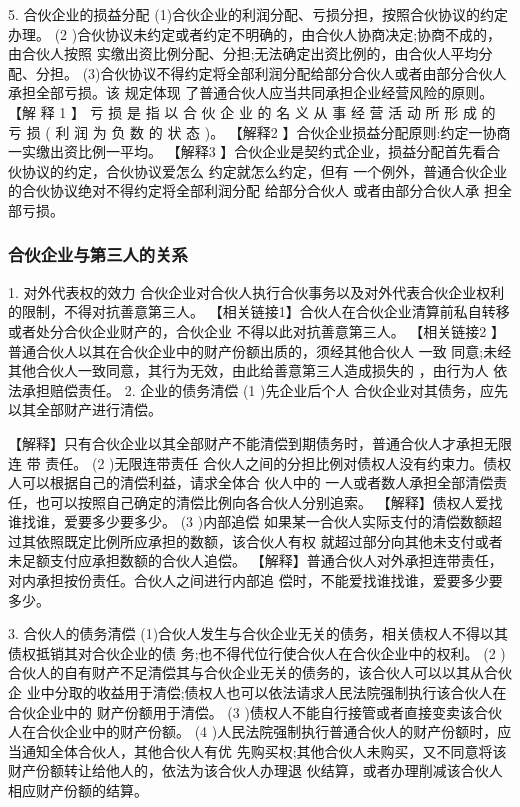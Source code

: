\documentclass[UTF8,12pt]{ctexart}
\numberwithin{equation}{section} %
\numberwithin{figure}{section}
\numberwithin{table}{section}
\begin{document}
	5. 合伙企业的损益分配 (1)合伙企业的利润分配、亏损分担，按照合伙协议的约定办理。
	(2 )合伙协议未约定或者约定不明确的，由合伙人协商决定;协商不成的，由合伙人按照 实缴出资比例分配、分担;无法确定出资比例的，由合伙人平均分配、分担。 (3)合伙协议不得约定将全部利润分配给部分合伙人或者由部分合伙人承担全部亏损。该 规定体现 了普通合伙人应当共同承担企业经营风险的原则。
	【解 释 1 】 亏 损 是 指 以 合 伙 企 业 的 名 义 从 事 经 营 活 动 所 形 成 的 亏 损 ( 利 润 为 负 数 的
	状 态 )。
	【解释2 】合伙企业损益分配原则:约定一协商一实缴出资比例一平均。
	【解释3 】合伙企业是契约式企业，损益分配首先看合伙协议的约定，合伙协议爱怎么 约定就怎么约定，但有 一个例外，普通合伙企业的合伙协议绝对不得约定将全部利润分配 给部分合伙人 或者由部分合伙人承 担全 部亏损。
	
	\subsubsection{合伙企业与第三人的关系}
	1. 对外代表权的效力 合伙企业对合伙人执行合伙事务以及对外代表合伙企业权利的限制，不得对抗善意第三人。
	【相关链接1】合伙人在合伙企业清算前私自转移或者处分合伙企业财产的，合伙企业 不得以此对抗善意第三人。
	【相关链接2 】普通合伙人以其在合伙企业中的财产份额出质的，须经其他合伙人 一致 同意;未经其他合伙人一致同意，其行为无效，由此给善意第三人造成损失的 ，由行为人 依法承担赔偿责任。
	2. 企业的债务清偿
	(1 )先企业后个人 合伙企业对其债务，应先以其全部财产进行清偿。
	
	【解释】只有合伙企业以其全部财产不能清偿到期债务时，普通合伙人才承担无限连 带 责任。
	(2 )无限连带责任 合伙人之间的分担比例对债权人没有约束力。债权人可以根据自己的清偿利益，请求全体合 伙人中的 一人或者数人承担全部清偿责任，也可以按照自己确定的清偿比例向各合伙人分别追索。 【解释】债权人爱找谁找谁，爱要多少要多少。
	(3 )内部追偿 如果某一合伙人实际支付的清偿数额超过其依照既定比例所应承担的数额，该合伙人有权 就超过部分向其他未支付或者未足额支付应承担数额的合伙人追偿。
	【解释】普通合伙人对外承担连带责任，对内承担按份责任。合伙人之间进行内部追 偿时，不能爱找谁找谁，爱要多少要多少。
	
	3. 合伙人的债务清偿 (1)合伙人发生与合伙企业无关的债务，相关债权人不得以其债权抵销其对合伙企业的债 务;也不得代位行使合伙人在合伙企业中的权利。
	(2 )合伙人的自有财产不足清偿其与合伙企业无关的债务的，该合伙人可以以其从合伙企 业中分取的收益用于清偿;债权人也可以依法请求人民法院强制执行该合伙人在合伙企业中的 财产份额用于清偿。
	(3 )债权人不能自行接管或者直接变卖该合伙人在合伙企业中的财产份额。
	(4 )人民法院强制执行普通合伙人的财产份额时，应当通知全体合伙人，其他合伙人有优 先购买权;其他合伙人未购买，又不同意将该财产份额转让给他人的，依法为该合伙人办理退 伙结算，或者办理削减该合伙人相应财产份额的结算。
	
\end{document}
